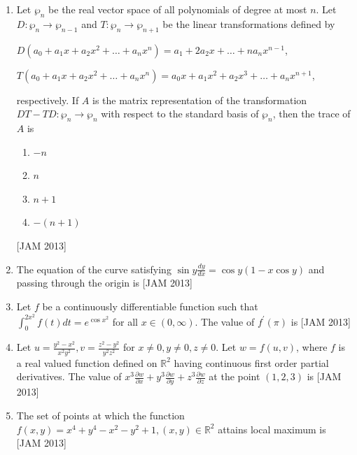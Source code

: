 \begin{enumerate}
\item  Let $\wp_{n}$ be the real vector space of all polynomials of degree at most $n$. Let $D: \wp_{n} \rightarrow \wp_{n-1}$ and $T: \wp_{n} \rightarrow \wp_{n+1}$ be the linear transformations defined by

$D\left(a_{0}+a_{1} x+a_{2} x^{2}+\ldots+a_{n} x^{n}\right)=a_{1}+2 a_{2} x+\ldots+n a_{n} x^{n-1}$,

$T\left(a_{0}+a_{1} x+a_{2} x^{2}+\ldots+a_{n} x^{n}\right)=a_{0} x+a_{1} x^{2}+a_{2} x^{3}+\ldots+a_{n} x^{n+1}$,

respectively. If $A$ is the matrix representation of the transformation $D T-T D: \wp_{n} \rightarrow \wp_{n}$ with respect to the standard basis of $\wp_{n}$, then the trace of $A$ is 

\begin{enumerate}
 \item $-n$ 
\item $n$ 
\item $n+1$ 
\item $-(n+1)$
\end{enumerate}
\hfill [JAM 2013]




\item  The equation of the curve satisfying $\sin y \frac{d y}{d x}=\cos y(1-x \cos y)$ and passing through the origin is
\hfill [JAM 2013]



\item  Let $f$ be a continuously differentiable function such that $\int_{0}^{2 x^{2}} f(t) d t=e^{\cos x^{2}}$ for all $x \in(0, \infty)$. The value of $f^{\prime}(\pi)$ is
\hfill [JAM 2013]



\item  Let $u=\frac{y^{2}-x^{2}}{x^{2} y^{2}}, v=\frac{z^{2}-y^{2}}{y^{2} z^{2}}$ for $x \neq 0, y \neq 0, z \neq 0$. Let $w=f(u, v)$, where $f$ is a real valued function defined on $\mathbb{R}^{2}$ having continuous first order partial derivatives. The value of $x^{3} \frac{\partial w}{\partial x}+y^{3} \frac{\partial w}{\partial y}+z^{3} \frac{\partial w}{\partial z}$ at the point $(1,2,3)$ is
\hfill [JAM 2013]



\item  The set of points at which the function $f(x, y)=x^{4}+y^{4}-x^{2}-y^{2}+1,(x, y) \in \mathbb{R}^{2}$ attains local maximum is
\hfill [JAM 2013]




\end{enumerate}

